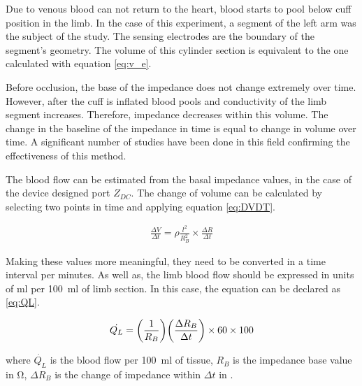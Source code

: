 
Due to venous blood can not return to the heart, blood starts to pool below cuff position in the limb. In the case of this experiment, a segment of the left arm was the subject of the study. The sensing electrodes are the boundary of the segment's geometry. The volume of this cylinder section is equivalent to the one calculated with equation \ref{eq:v_e}. 

Before occlusion, the base of the impedance does not change extremely over time. However, after the cuff is inflated blood pools and conductivity of the limb segment increases. Therefore, impedance decreases within this volume. The change in the baseline of the impedance in time is equal to change in volume over time. A significant number of studies have been done in this field confirming the effectiveness of this method. 


The blood flow can be estimated from the basal impedance values, in the case of the device designed port $Z_{DC}$. The change of volume can be calculated by selecting two points in time and applying equation \ref{eq:DVDT}.


\begin{align}
	\label{eq:DVDT}
	\frac{\Delta V}{\Delta t}= \rho \frac{l^2}{R_B^2} \times \frac{\Delta R}{\Delta t}
\end{align} 

Making these values more meaningful, they need to be converted in a time interval per minutes. As well as, the limb blood flow should be expressed in units of \si{\milli\litre} per \SI{100}{\milli\litre} of limb section. In this case, the equation can be declared as \ref{eq:QL}.

\begin{align}
	\label{eq:QL}
	\dot{Q_L} = \bigg( \frac{1}{R_B} \bigg) \bigg( \frac{\Delta R_B}{\Delta t} \bigg) \times 60  \times 100  \tagaddtext{[\si{ml/min.100.ml}]}
\end{align} 

where $\dot{Q_L}$ is the blood flow per \SI{100}{\milli\litre} of tissue, $R_B$ is the impedance base value in \si{\ohm}, $\Delta R_B$ is the change of impedance within ${\Delta t}$ in \si{\sec}.

